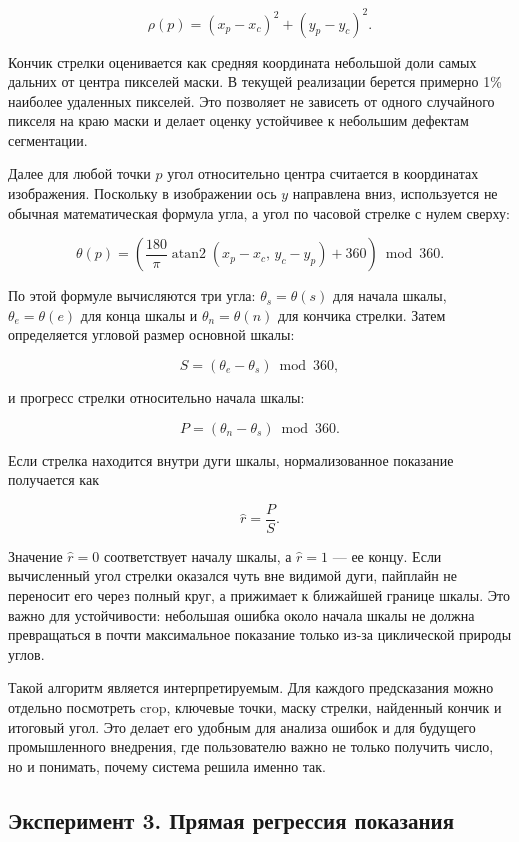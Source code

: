 \documentclass[a4paper,14pt]{extarticle}
\begin{document}
	\[
		\rho(p) = (x_p - x_c)^2 + (y_p - y_c)^2.
	\]

	Кончик стрелки оценивается как средняя координата небольшой доли самых дальних от центра пикселей маски. В текущей реализации берется примерно 1\% наиболее удаленных пикселей. Это позволяет не зависеть от одного случайного пикселя на краю маски и делает оценку устойчивее к небольшим дефектам сегментации.

	Далее для любой точки $p$ угол относительно центра считается в координатах изображения. Поскольку в изображении ось $y$ направлена вниз, используется не обычная математическая формула угла, а угол по часовой стрелке с нулем сверху:

	\[
		\theta(p) =
		\left(
		\frac{180}{\pi}
		\operatorname{atan2}(x_p - x_c,\, y_c - y_p)
		+ 360
		\right) \bmod 360.
	\]

	По этой формуле вычисляются три угла: $\theta_s=\theta(s)$ для начала шкалы, $\theta_e=\theta(e)$ для конца шкалы и $\theta_n=\theta(n)$ для кончика стрелки. Затем определяется угловой размер основной шкалы:

	\[
		S = (\theta_e - \theta_s) \bmod 360,
	\]

	и прогресс стрелки относительно начала шкалы:

	\[
		P = (\theta_n - \theta_s) \bmod 360.
	\]

	Если стрелка находится внутри дуги шкалы, нормализованное показание получается как

	\[
		\hat{r} = \frac{P}{S}.
	\]

	Значение $\hat{r}=0$ соответствует началу шкалы, а $\hat{r}=1$ --- ее концу. Если вычисленный угол стрелки оказался чуть вне видимой дуги, пайплайн не переносит его через полный круг, а прижимает к ближайшей границе шкалы. Это важно для устойчивости: небольшая ошибка около начала шкалы не должна превращаться в почти максимальное показание только из-за циклической природы углов.

	Такой алгоритм является интерпретируемым. Для каждого предсказания можно отдельно посмотреть crop, ключевые точки, маску стрелки, найденный кончик и итоговый угол. Это делает его удобным для анализа ошибок и для будущего промышленного внедрения, где пользователю важно не только получить число, но и понимать, почему система решила именно так.

	\subsection{Эксперимент 3. Прямая регрессия показания}
\end{document}
